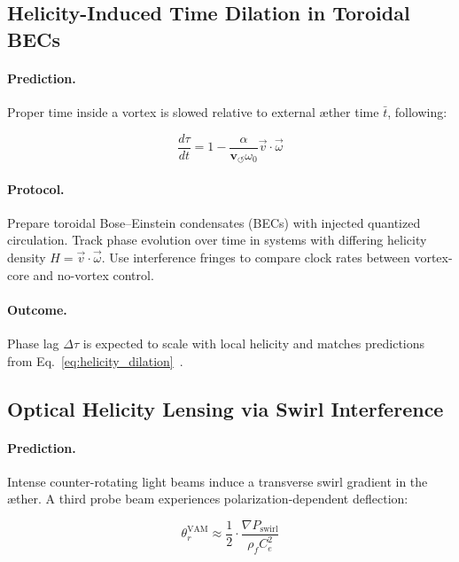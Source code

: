 \documentclass[preprint]{revtex4-2}
\begin{document}
            \subsection{Helicity-Induced Time Dilation in Toroidal BECs}
            \paragraph{Prediction.}
            Proper time inside a vortex is slowed relative to external æther time \( \bar{t} \), following:
        
            \begin{equation}
            \frac{d\tau}{dt} = 1 - \frac{\alpha}{\mathbf{v}_{\scriptscriptstyle\boldsymbol{\circlearrowleft}} \omega_0} \vec{v} \cdot \vec{\omega}
            \label{eq:helicity_dilation}
            \end{equation}
        
            \paragraph{Protocol.}
            Prepare toroidal Bose–Einstein condensates (BECs) with injected quantized circulation. Track phase evolution over time in systems with differing helicity density \( H = \vec{v} \cdot \vec{\omega} \). Use interference fringes to compare clock rates between vortex-core and no-vortex control.
        
            \paragraph{Outcome.}
            Phase lag \( \Delta \tau \) is expected to scale with local helicity and matches predictions from Eq.~\ref{eq:helicity_dilation}~\cite{volovik2003universe, ranada1990topological}.
        
            \subsection{Optical Helicity Lensing via Swirl Interference}
            \paragraph{Prediction.}
            Intense counter-rotating light beams induce a transverse swirl gradient in the æther. A third probe beam experiences polarization-dependent deflection:
        
            \begin{equation}
                \boxed{
                    \theta_r^{\text{VAM}} \approx \frac{1}{2} \cdot \frac{\nabla P_{\text{swirl}}}{\rho_{\scriptscriptstyle\boldsymbol\!f} C_e^2}
                }
            \label{eq:optical_deflection}
            \end{equation}
        
\end{document}
